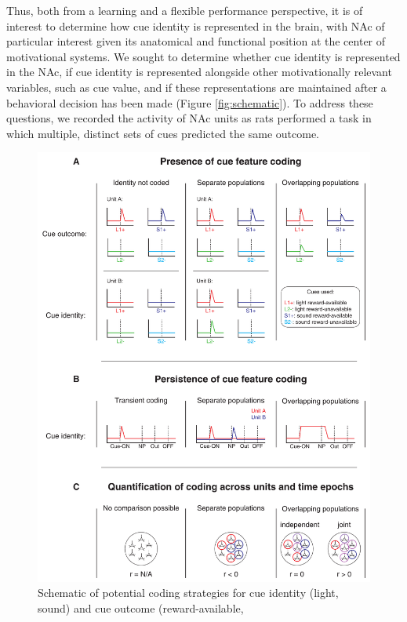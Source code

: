 \documentclass[11pt]{article}
\begin{document}
Thus, both from a learning and a flexible performance perspective, it
is of interest to determine how cue identity is represented in the
brain, with NAc of particular interest given its anatomical and
functional position at the center of motivational systems. We sought
to determine whether cue identity is represented in the NAc, if cue
identity is represented alongside other motivationally relevant
variables, such as cue value, and if these representations are
maintained after a behavioral decision has been made (Figure
\ref{fig:schematic}). To address these questions, we recorded the
activity of NAc units as rats performed a task in which multiple,
distinct sets of cues predicted the same outcome.


 \begin{figure}[ht!]
\centering
\includegraphics[height=0.7\textheight]{Fig 1 - Schematic neural.pdf}
\caption{Schematic of potential coding strategies for cue identity
  (light, sound) and cue outcome (reward-available,
}
\end{figure}
\end{document}
